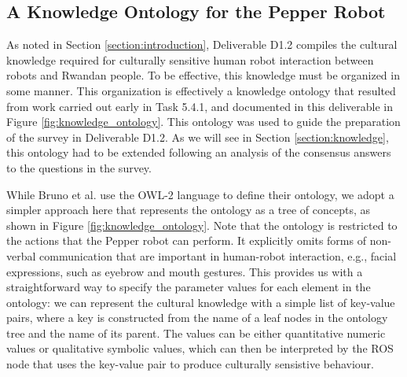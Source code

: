 \documentclass{CSSRforAfrica}
\begin{document}
\subsection{A Knowledge Ontology for the Pepper Robot}
\label{section:pepper}
 

As noted in Section \ref{section:introduction}, Deliverable D1.2 compiles the cultural knowledge required for culturally sensitive human robot interaction between robots and Rwandan people. To be effective, this knowledge must be organized in some manner. This organization is effectively a knowledge ontology that resulted from work carried out early in Task 5.4.1, and documented in this deliverable in Figure \ref{fig:knowledge_ontology}. This ontology was used to guide the preparation of the survey in Deliverable D1.2. As we will see in Section \ref{section:knowledge}, this ontology had to be extended following an analysis of the consensus answers to the questions in the survey.

While Bruno et al. \cite{Brunoetal2019} use the OWL-2 language  to define their ontology, we adopt a simpler approach here that represents the ontology as a tree of concepts, as shown in  Figure \ref{fig:knowledge_ontology}. 
Note that the ontology is restricted to the actions that the Pepper robot can perform.
It explicitly omits forms of non-verbal communication that are important in human-robot interaction, e.g., facial expressions, such as eyebrow and mouth gestures. This provides us with a straightforward way to specify the parameter values for each element in the ontology: we can represent the cultural knowledge with a simple list of key-value pairs, where a key is constructed from the name of a leaf nodes in the ontology tree and the name of its parent.  The values can be either quantitative numeric values or qualitative symbolic values, which can then be interpreted by the ROS node that uses the key-value pair to produce culturally sensistive behaviour.  
\end{document}

